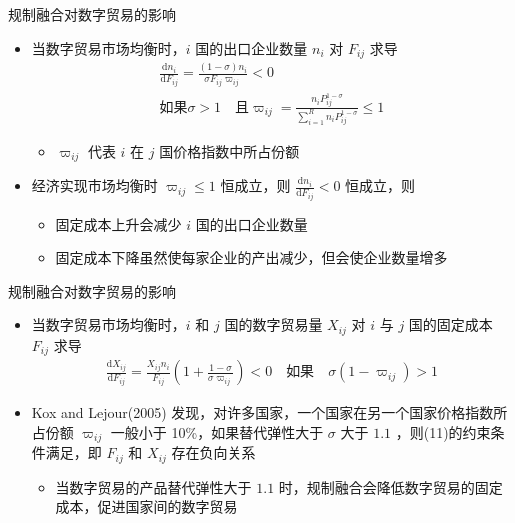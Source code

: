 \documentclass{beamer}
\begin{document}
\begin{frame}{规制融合对数字贸易的影响}
    \begin{itemize}
        \item 当数字贸易市场均衡时，$i$ 国的出口企业数量 $n_i$ 对 $F_{ij}$ 求导
        \begin{gather*}
            \frac{{\mathrm{d}n_i}}{{\mathrm{d}F_{ij}}} = \frac{(1-\sigma)n_i}{\sigma F_{ij}\varpi_{ij}} < 0 \tag{10} \\
            \text{如果} \sigma > 1 \quad \text{且} \varpi_{ij}=\frac{n_iP_{ij}^{1-\sigma}}{\sum_{i=1}^R n_i P_{ij}^{1-\sigma}} \leqslant 1
        \end{gather*}
        \begin{itemize}
            \item $\varpi_{ij}$ 代表 $i$ 在 $j$ 国价格指数中所占份额
        \end{itemize}
        \item 经济实现市场均衡时 $\varpi_{ij} \leqslant 1$ 恒成立，则 $\frac{{\mathrm{d}n_i}}{{\mathrm{d}F_{ij}}} < 0$ 恒成立，则
        \begin{itemize}
            \item 固定成本上升会减少 $i$ 国的出口企业数量
            \item 固定成本下降虽然使每家企业的产出减少，但会使企业数量增多
        \end{itemize}
    \end{itemize}
\end{frame}

\begin{frame}{规制融合对数字贸易的影响}
    \begin{itemize}
        \item 当数字贸易市场均衡时，$i$ 和 $j$ 国的数字贸易量 $X_{ij}$ 对 $i$ 与 $j$ 国的固定成本 $F_{ij}$ 求导
        \begin{gather*}
            \frac{\mathrm{d}X_{ij}}{\mathrm{d}F_{ij}} = \frac{X_{ij}n_i}{F_{ij}}\left(1+\frac{1-\sigma}{\sigma \varpi_{ij}}\right)<0 \quad \text{如果} \quad \sigma(1-\varpi_{ij})>1 \tag{11}
        \end{gather*}
        \item Kox and Lejour(2005) 发现，对许多国家，一个国家在另一个国家价格指数所占份额 $\varpi_{ij}$ 一般小于 10\%，如果替代弹性大于 $\sigma$ 大于 $1.1$ ，则(11)的约束条件满足，即 $F_{ij}$ 和 $X_{ij}$ 存在负向关系
        \begin{itemize}
            \item 当数字贸易的产品替代弹性大于 $1.1$ 时，规制融合会降低数字贸易的固定成本，促进国家间的数字贸易
        \end{itemize}
    \end{itemize}
\end{frame}
\end{document}
